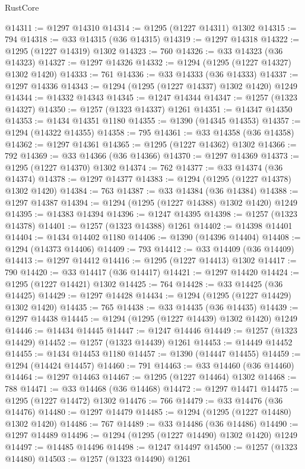 \begin{lexlean}{RustCore}
\begin{coremodule}
@14311 := @1297 @14310
@14314 := @1295 (@1227 @14311) @1302
@14315 := 794
@14318 := @33 @14315 (@36 @14315)
@14319 := @1297 @14318
@14322 := @1295 (@1227 @14319) @1302
@14323 := 760
@14326 := @33 @14323 (@36 @14323)
@14327 := @1297 @14326
@14332 := @1294 (@1295 (@1227 @14327) @1302 @1420)
@14333 := 761
@14336 := @33 @14333 (@36 @14333)
@14337 := @1297 @14336
@14343 := @1294 (@1295 (@1227 @14337) @1302 @1420) @1249
@14344 := @14332 @14343
@14345 := @1247 @14344
@14347 := @1257 (@1323 @14327)
@14350 := @1257 (@1323 @14337) @1261
@14351 := @14347 @14350
@14353 := @1434 @14351 @1180
@14355 := @1390 (@14345 @14353)
@14357 := @1294 (@14322 @14355)
@14358 := 795
@14361 := @33 @14358 (@36 @14358)
@14362 := @1297 @14361
@14365 := @1295 (@1227 @14362) @1302
@14366 := 792
@14369 := @33 @14366 (@36 @14366)
@14370 := @1297 @14369
@14373 := @1295 (@1227 @14370) @1302
@14374 := 762
@14377 := @33 @14374 (@36 @14374)
@14378 := @1297 @14377
@14383 := @1294 (@1295 (@1227 @14378) @1302 @1420)
@14384 := 763
@14387 := @33 @14384 (@36 @14384)
@14388 := @1297 @14387
@14394 := @1294 (@1295 (@1227 @14388) @1302 @1420) @1249
@14395 := @14383 @14394
@14396 := @1247 @14395
@14398 := @1257 (@1323 @14378)
@14401 := @1257 (@1323 @14388) @1261
@14402 := @14398 @14401
@14404 := @1434 @14402 @1180
@14406 := @1390 (@14396 @14404)
@14408 := @1294 (@14373 @14406)
@14409 := 793
@14412 := @33 @14409 (@36 @14409)
@14413 := @1297 @14412
@14416 := @1295 (@1227 @14413) @1302
@14417 := 790
@14420 := @33 @14417 (@36 @14417)
@14421 := @1297 @14420
@14424 := @1295 (@1227 @14421) @1302
@14425 := 764
@14428 := @33 @14425 (@36 @14425)
@14429 := @1297 @14428
@14434 := @1294 (@1295 (@1227 @14429) @1302 @1420)
@14435 := 765
@14438 := @33 @14435 (@36 @14435)
@14439 := @1297 @14438
@14445 := @1294 (@1295 (@1227 @14439) @1302 @1420) @1249
@14446 := @14434 @14445
@14447 := @1247 @14446
@14449 := @1257 (@1323 @14429)
@14452 := @1257 (@1323 @14439) @1261
@14453 := @14449 @14452
@14455 := @1434 @14453 @1180
@14457 := @1390 (@14447 @14455)
@14459 := @1294 (@14424 @14457)
@14460 := 791
@14463 := @33 @14460 (@36 @14460)
@14464 := @1297 @14463
@14467 := @1295 (@1227 @14464) @1302
@14468 := 788
@14471 := @33 @14468 (@36 @14468)
@14472 := @1297 @14471
@14475 := @1295 (@1227 @14472) @1302
@14476 := 766
@14479 := @33 @14476 (@36 @14476)
@14480 := @1297 @14479
@14485 := @1294 (@1295 (@1227 @14480) @1302 @1420)
@14486 := 767
@14489 := @33 @14486 (@36 @14486)
@14490 := @1297 @14489
@14496 := @1294 (@1295 (@1227 @14490) @1302 @1420) @1249
@14497 := @14485 @14496
@14498 := @1247 @14497
@14500 := @1257 (@1323 @14480)
@14503 := @1257 (@1323 @14490) @1261

\end{coremodule}
\end{lexlean}
